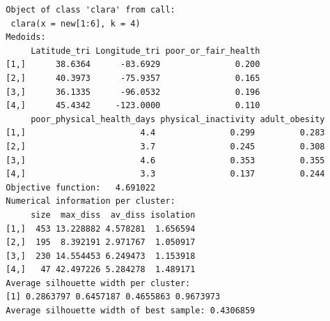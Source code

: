 \documentclass[12pt,twoside]{amherstthesis}
\begin{document}
  \begin{verbatim}
  Object of class 'clara' from call:
   clara(x = new[1:6], k = 4) 
  Medoids:
       Latitude_tri Longitude_tri poor_or_fair_health
  [1,]      38.6364      -83.6929               0.200
  [2,]      40.3973      -75.9357               0.165
  [3,]      36.1335      -96.0532               0.196
  [4,]      45.4342     -123.0000               0.110
       poor_physical_health_days physical_inactivity adult_obesity
  [1,]                       4.4               0.299         0.283
  [2,]                       3.7               0.245         0.308
  [3,]                       4.6               0.353         0.355
  [4,]                       3.3               0.137         0.244
  Objective function:   4.691022 
  Numerical information per cluster:
       size  max_diss  av_diss isolation
  [1,]  453 13.228882 4.578281  1.656594
  [2,]  195  8.392191 2.971767  1.050917
  [3,]  230 14.554453 6.249473  1.153918
  [4,]   47 42.497226 5.284278  1.489171
  Average silhouette width per cluster:
  [1] 0.2863797 0.6457187 0.4655863 0.9673973
  Average silhouette width of best sample: 0.4306859 
  

\end{verbatim}
\end{document}
